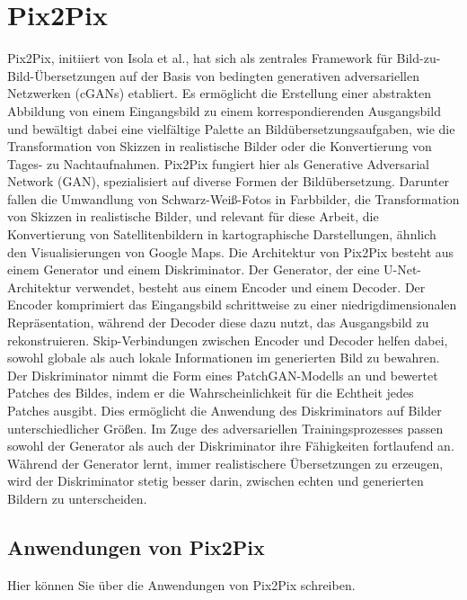 \section{Pix2Pix}
Pix2Pix, initiiert von Isola et al., hat sich als zentrales Framework für Bild-zu-Bild-Übersetzungen auf der Basis von bedingten generativen adversariellen Netzwerken (cGANs) etabliert. Es ermöglicht die Erstellung einer abstrakten Abbildung von einem Eingangsbild zu einem korrespondierenden Ausgangsbild und bewältigt dabei eine vielfältige Palette an Bildübersetzungsaufgaben, wie die Transformation von Skizzen in realistische Bilder oder die Konvertierung von Tages- zu Nachtaufnahmen. \newline
Pix2Pix fungiert hier als Generative Adversarial Network (GAN), spezialisiert auf diverse Formen der Bildübersetzung. Darunter fallen die Umwandlung von Schwarz-Weiß-Fotos in Farbbilder, die Transformation von Skizzen in realistische Bilder, und relevant für diese Arbeit, die Konvertierung von Satellitenbildern in kartographische Darstellungen, ähnlich den Visualisierungen von Google Maps. \newline	Die Architektur von Pix2Pix besteht aus einem Generator und einem Diskriminator. Der Generator, der eine U-Net-Architektur verwendet, besteht aus einem Encoder und einem Decoder. Der Encoder komprimiert das Eingangsbild schrittweise zu einer niedrigdimensionalen Repräsentation, während der Decoder diese dazu nutzt, das Ausgangsbild zu rekonstruieren. Skip-Verbindungen zwischen Encoder und Decoder helfen dabei, sowohl globale als auch lokale Informationen im generierten Bild zu bewahren. \newline
Der Diskriminator nimmt die Form eines PatchGAN-Modells an und bewertet Patches des Bildes, indem er die Wahrscheinlichkeit für die Echtheit jedes Patches ausgibt. Dies ermöglicht die Anwendung des Diskriminators auf Bilder unterschiedlicher Größen. Im Zuge des adversariellen Trainingsprozesses passen sowohl der Generator als auch der Diskriminator ihre Fähigkeiten fortlaufend an. Während der Generator lernt, immer realistischere Übersetzungen zu erzeugen, wird der Diskriminator stetig besser darin, zwischen echten und generierten Bildern zu unterscheiden.
  



\subsection{Anwendungen von Pix2Pix}
Hier können Sie über die Anwendungen von Pix2Pix schreiben.

